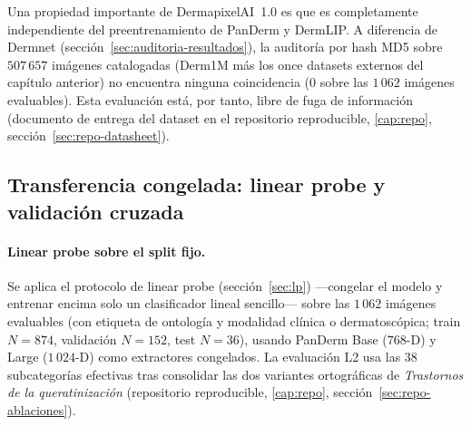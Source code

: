 Una propiedad importante de DermapixelAI~1.0 es que es completamente
independiente del preentrenamiento de PanDerm y DermLIP. A diferencia
de Dermnet (sección~\ref{sec:auditoria-resultados}), la auditoría por
hash MD5 sobre $507\,657$ imágenes catalogadas (Derm1M más los once
datasets externos del capítulo anterior) no encuentra ninguna
coincidencia ($0$ sobre las $1\,062$ imágenes evaluables). Esta
evaluación está, por tanto, libre de fuga de información (documento de
entrega del dataset en el repositorio reproducible, \ref{cap:repo},
sección~\ref{sec:repo-datasheet}).

\subsection{Transferencia congelada: linear probe y validación cruzada}

\paragraph{Linear probe sobre el split fijo.}
Se aplica el protocolo de linear probe (sección~\ref{sec:lp})
---congelar el modelo y entrenar encima solo un clasificador lineal
sencillo--- sobre las $1\,062$ imágenes evaluables (con etiqueta de
ontología y modalidad clínica o dermatoscópica; train $N = 874$,
validación $N = 152$, test $N = 36$), usando PanDerm Base ($768$-D) y
Large ($1\,024$-D) como extractores congelados. La evaluación L2 usa las $38$ subcategorías
efectivas tras consolidar las dos variantes ortográficas de
\emph{Trastornos de la queratinización} (repositorio reproducible,
\ref{cap:repo}, sección~\ref{sec:repo-ablaciones}).

